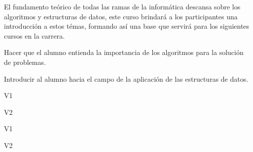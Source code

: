 \begin{syllabus}


\begin{justification}
El fundamento teórico de todas las ramas de la informática descansa sobre los algoritmos y estructuras de datos, este curso brindará a los participantes una introducción a estos témas, formando así­ una base que servirá para los siguientes cursos en la carrera.
\end{justification}

\begin{goals}
\item Hacer que el alumno entienda la importancia de los algoritmos para la solución de problemas.
\item Introducir al alumno hacia el campo de la aplicación de las estructuras de datos.
\end{goals}

\begin{outcomes}{V1}
    \item {}
    \item {}
    \item {}
\end{outcomes}

\begin{outcomes}{V2}
    \item {}
    \item {}
    \item {}
\end{outcomes}

\begin{competences}{V1}
    \item {}
    \item {}
    \item {}
    \item {}
\end{competences}

\begin{competences}{V2}
    \item {} 
    \item {}
    \item {}
    \item {}    
\end{competences}


\end{syllabus}
